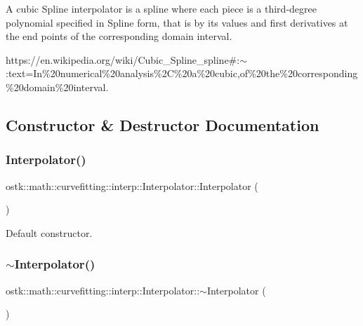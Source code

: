 A cubic Spline interpolator is a spline where each piece is a third-\/degree polynomial specified in Spline form, that is by its values and first derivatives at the end points of the corresponding domain interval.

https\+://en.wikipedia.\+org/wiki/\+Cubic\+\_\+\+Spline\+\_\+spline\#\+:$\sim$\+:text=In\%20numerical\%20analysis\%2C\%20a\%20cubic,of\%20the\%20corresponding\%20domain\%20interval. 

\subsection{Constructor \& Destructor Documentation}
\mbox{\label{classostk_1_1math_1_1curvefitting_1_1interp_1_1_interpolator_afcb021e5aa9972479e9e0750b86c6cd4}} 
\subsubsection{\texorpdfstring{Interpolator()}{Interpolator()}}
{\footnotesize\ttfamily ostk\+::math\+::curvefitting\+::interp\+::\+Interpolator\+::\+Interpolator (\begin{DoxyParamCaption}{ }\end{DoxyParamCaption})\hspace{0.3cm}{\ttfamily [default]}}



Default constructor. 

\mbox{\label{classostk_1_1math_1_1curvefitting_1_1interp_1_1_interpolator_a6a6a80292cecb1353e1f7f5e8f147795}} 
\subsubsection{\texorpdfstring{$\sim$\+Interpolator()}{~Interpolator()}}
{\footnotesize\ttfamily ostk\+::math\+::curvefitting\+::interp\+::\+Interpolator\+::$\sim$\+Interpolator (\begin{DoxyParamCaption}{ }\end{DoxyParamCaption})\hspace{0.3cm}{\ttfamily [pure virtual]}}



